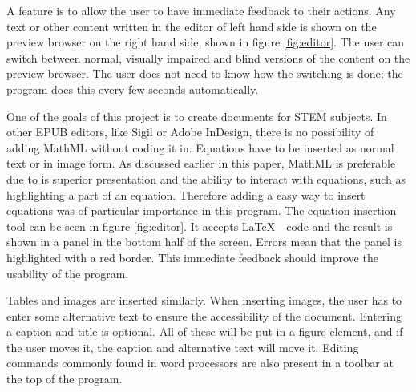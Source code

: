 \documentclass{llncs}
\begin{document}
A feature is to allow the user to have immediate feedback to their actions. Any text or other content written in the editor of left hand side is shown on the preview browser on the right hand side, shown in figure \ref{fig:editor}. The user can switch between normal, visually impaired and blind versions of the content on the preview browser. The user does not need to know how the switching is done; the program does this every few seconds automatically. 

One of the goals of this project is to create documents for STEM subjects. In other EPUB editors, like Sigil or Adobe InDesign, there is no possibility of adding MathML without coding it in. Equations have to be inserted as normal text or in image form. As discussed earlier in this paper, MathML is preferable due to is superior presentation and the ability to interact with equations, such as highlighting a part of an equation. Therefore adding a easy way to insert equations was of particular importance in this program. The equation insertion tool can be seen in figure \ref{fig:editor}. It accepts \LaTeX $\mbox{ }$ code and the result is shown in a panel in the bottom half of the screen. Errors mean that the panel is highlighted with a red border. This immediate feedback should improve the usability of the program.

Tables and images are inserted similarly. When inserting images, the user has to enter some alternative text to ensure the accessibility of the document. Entering a caption and title is optional. All of these will be put in a figure element, and if the user moves it, the caption and alternative text will move it. Editing commands commonly found in word processors are also present in a toolbar at the top of the program.

\end{document}
